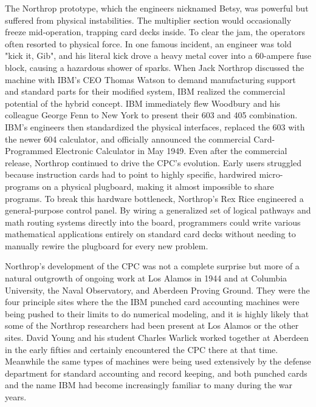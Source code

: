 The Northrop prototype, which the engineers nicknamed Betsy, was powerful but suffered from physical instabilities. The multiplier section would occasionally freeze mid-operation, trapping card decks inside. To clear the jam, the operators often resorted to physical force. In one famous incident, an engineer was told "kick it, Gib", and his literal kick drove a heavy metal cover into a 60-ampere fuse block, causing a hazardous shower of sparks. When Jack Northrop discussed the machine with IBM's CEO Thomas Watson to demand manufacturing support and standard parts for their modified system, IBM realized the commercial potential of the hybrid concept. IBM immediately flew Woodbury and his colleague George Fenn to New York to present their 603 and 405 combination. IBM's engineers then standardized the physical interfaces, replaced the 603 with the newer 604 calculator, and officially announced the commercial Card-Programmed Electronic Calculator in May 1949. Even after the commercial release, Northrop continued to drive the CPC's evolution. Early users struggled because instruction cards had to point to highly specific, hardwired micro-programs on a physical plugboard, making it almost impossible to share programs. To break this hardware bottleneck, Northrop's Rex Rice engineered a general-purpose control panel. By wiring a generalized set of logical pathways and math routing systems directly into the board, programmers could write various mathematical applications entirely on standard card decks without needing to manually rewire the plugboard for every new problem.

Northrop's development of the CPC was not a complete surprise but more of a natural outgrowth of ongoing work at Los Alamos in 1944 and at Columbia University, the Naval Observatory, and Aberdeen Proving Ground. They were the four principle sites where the the IBM punched card accounting machines were being pushed to their limits to do numerical modeling, and it is highly likely that some of the Northrop researchers had been present at Los Alamos or the other sites. David Young and his student Charles Warlick worked together at Aberdeen in the early fifties and certainly encountered the CPC there at that time. Meanwhile the same types of machines were being used extensively by the defense department for standard accounting and record keeping, and both punched cards and the name IBM had become increasingly familiar to many during the war years. \cite{youngUseRichardsonsMethod1953} \cite{archerAlamosComputingFacility2021}

